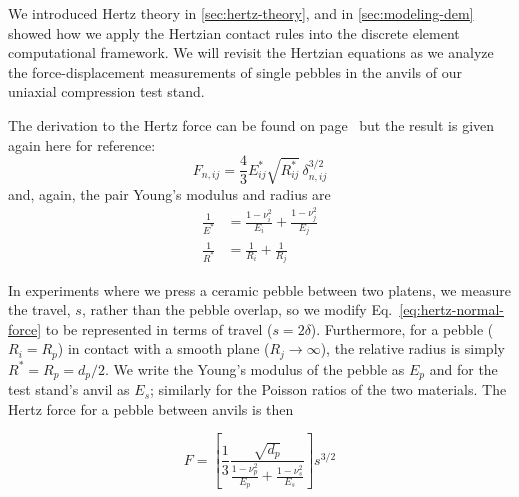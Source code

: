 




We introduced Hertz theory in \cref{sec:hertz-theory}, and in \cref{sec:modeling-dem} showed how we apply the Hertzian contact rules into the discrete element computational framework. We will revisit the Hertzian equations as we analyze the force-displacement measurements of single pebbles in the anvils of our uniaxial compression test stand.

The derivation to the Hertz force can be found on page~\pageref{eq:hertz-normal-force} but the result is given again here for reference:
\begin{equation*}
  F_{n,ij} = \frac{4}{3}E_{ij}^* \sqrt{R_{ij}^*} \, \delta_{n,ij}^{3/2}
\end{equation*}
and, again, the pair Young's modulus and radius are
\begin{align*}
\frac{1}{E^*} & = \frac{1-\nu_i^2}{E_i} + \frac{1-\nu_j^2}{E_j} \\
\frac{1}{R^*} & = \frac{1}{R_i} + \frac{1}{R_j}
\end{align*}

In experiments where we press a ceramic pebble between two platens, we measure the travel, $s$, rather than the pebble overlap, so we modify Eq.~\ref{eq:hertz-normal-force} to be represented in terms of travel ($s = 2\delta$). Furthermore, for a pebble ($R_i = R_p$) in contact with a smooth plane ($R_j \rightarrow \infty$), the relative radius is simply $R^* = R_p = d_p/2$. We write the Young's modulus of the pebble as $E_p$ and for the test stand's anvil as $E_s$; similarly for the Poisson ratios of the two materials. The Hertz force for a pebble between anvils is then

\begin{equation}\label{eq:contact-force}
        F = \left[\frac{1}{3}\frac{\sqrt{d_p}}{\frac{1-\nu_p^2}{E_p} + \frac{1-\nu_s^2}{E_s}}\right] s^{3/2}
\end{equation}


